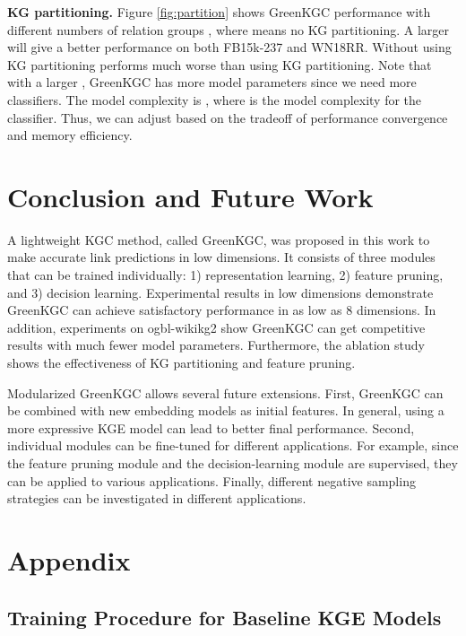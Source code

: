 \documentclass{article}
\begin{document}
{\color{black}
\textbf{KG partitioning.} Figure \ref{fig:partition} shows GreenKGC performance with
different numbers of relation groups , where  means no KG partitioning.
A larger  will give a better performance on both FB15k-237 and WN18RR. Without using KG
partitioning performs much worse than using KG partitioning.
Note that with a larger , GreenKGC has more model parameters since we need more classifiers.
The model complexity is , where  is the model complexity for the
classifier. Thus, we can adjust  based on the tradeoff of performance convergence 
and memory efficiency.
}

\section{Conclusion and Future Work} \label{sec:conclusion}

A lightweight KGC method, called GreenKGC, was proposed in this work
to make accurate link predictions in low dimensions. It consists of three modules that
can be trained individually: 1) representation learning, 2) feature pruning,
and 3) decision learning. Experimental results in low dimensions demonstrate
GreenKGC can achieve satisfactory performance in as low as 8 dimensions. In addition,
experiments on ogbl-wikikg2 show GreenKGC can get competitive results 
with much fewer model parameters. Furthermore, the ablation study shows the 
effectiveness of KG partitioning and feature pruning.

{\color{black} Modularized GreenKGC allows several future extensions. 
First, GreenKGC can be combined with new embedding
models as initial features. In general, using a more expressive KGE model can
lead to better final performance. Second, individual modules can
be fine-tuned for different applications. For example, since the feature
pruning module and the decision-learning module are supervised, they can
be applied to various applications. Finally, different negative sampling
strategies can be investigated in different applications.}


\renewcommand\refname{Reference}


\newpage
\section{Appendix}

\subsection{Training Procedure for Baseline KGE Models}\label{appendix:emb}
\end{document}
